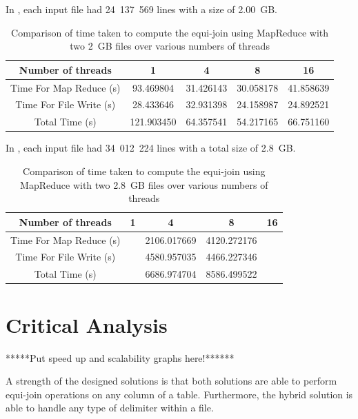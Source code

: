 \documentclass[10pt,twocolumn]{witseiepaper}
\begin{document}
In , each input file had 24~137~569  lines with a size of 2.00~GB. 

\begin{table} [t]
	\centering
	\caption{Comparison of time taken to compute the equi-join using MapReduce with two 2~GB files over various numbers of threads}
	\label{tab:results3}
	
	\begin{tabular}{|c|c|c|c|c|}
		\hline 
		Number of threads & 1 & 4 & 8 &16\\ 
		\hline
		\hline
		Time For Map Reduce (s) & 93.469804 & 31.426143 & 30.058178 & 41.858639\\ 
		\hline 
		Time For File Write (s) & 28.433646 & 32.931398& 24.158987 & 24.892521\\ 
		\hline 
		Total Time (s) & 121.903450 & 64.357541 & 54.217165 & 66.751160 \\ 
		\hline 
	\end{tabular} 
\end{table}


In , each input file had 34~012~224   lines with a total size of 2.8~GB. 

\begin{table} [t]
	\centering
	\caption{Comparison of time taken to compute the equi-join using MapReduce with two 2.8~GB files over various numbers of threads}
	\label{tab:results4}
	
	\begin{tabular}{|c|c|c|c|c|}
		\hline 
		Number of threads & 1 & 4 & 8 &16\\ 
		\hline
		\hline
		Time For Map Reduce (s) &  & 2106.017669 & 4120.272176 &  \\ 
		\hline 
		Time For File Write (s) &  & 4580.957035 & 4466.227346 & \\ 
		\hline 
		Total Time (s) &  & 6686.974704 & 8586.499522 &  \\ 
		\hline 
	\end{tabular} 
\end{table}

\section{Critical Analysis}

*****Put speed up and scalability graphs here!******


A strength of the designed solutions is that both solutions are able to perform equi-join operations on any column of a table. Furthermore, the hybrid solution is able to handle any type of delimiter within a file.
\end{document}
